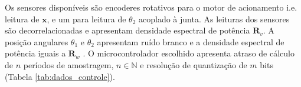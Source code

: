     Os sensores disponíveis são encoderes rotativos para o motor de acionamento i.e. leitura de $\mathbf{x}$, e um para leitura de $\theta_2$ acoplado à junta. As leituras dos sensores são decorrelacionadas e apresentam densidade espectral de potência $\mathbf{R}_v$. A posição angulares $\theta_1$ e $\theta_2$ apresentam ruído branco e a densidade espectral de potência iguais a $\mathbf{R}_w$ \cite{controle_digital_2018}. O microcontrolador escolhido apresenta atraso de cálculo de $n$ períodos de amostragem, $n \in \mathbb{N}$ e resolução de quantização de $m$ bits (Tabela \ref{tab:dados_controle}).
    
